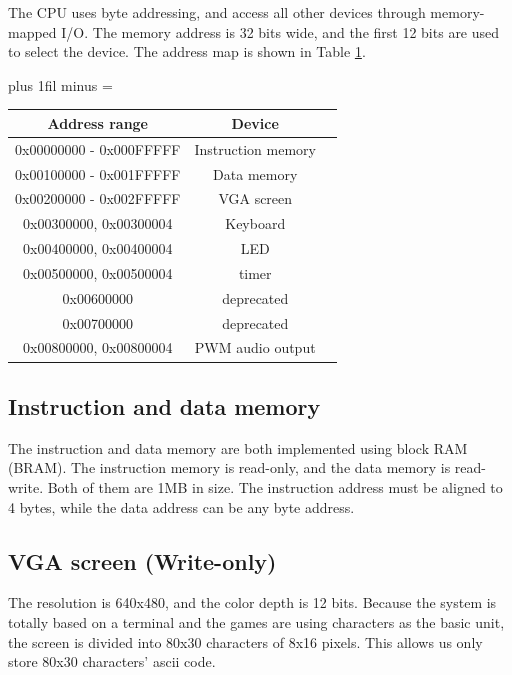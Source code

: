 \documentclass[
	a4paper, %
	11pt, %
]{CSUniSchoolLabReport}
\def\Scentering{\leftskip=0pt plus 1fil minus \Rmargin
                \rightskip=\leftskip}
\begin{document}
The CPU uses byte addressing, and access all other devices through memory-mapped I/O. The memory address is 32 bits wide, and the first 12 bits are used to select the device. The address map is shown in Table \ref{tab:address-map}.
\begin{table}[h]
    \Scentering
    \begin{tabular}{|c|c|c|}
        \hline
        Address range           & Device             \\
        \hline
        0x00000000 - 0x000FFFFF & Instruction memory \\
        \hline
        0x00100000 - 0x001FFFFF & Data memory        \\
        \hline
        0x00200000 - 0x002FFFFF & VGA screen         \\
        \hline
        0x00300000, 0x00300004  & Keyboard           \\
        \hline
        0x00400000, 0x00400004  & LED                \\
        \hline
        0x00500000, 0x00500004  & timer              \\
        \hline
        0x00600000              & deprecated         \\
        \hline
        0x00700000              & deprecated         \\
        \hline
        0x00800000, 0x00800004  & PWM audio output   \\
        \hline
    \end{tabular}
    \label{tab:address-map}
\end{table}

\subsection{Instruction and data memory}
The instruction and data memory are both implemented using block RAM (BRAM). The instruction memory is read-only, and the data memory is read-write. Both of them are 1MB in size. The instruction address must be aligned to 4 bytes, while the data address can be any byte address.
\subsection{VGA screen (Write-only)}
The resolution is 640x480, and the color depth is 12 bits. Because the system is totally based on a terminal and the games are using characters as the basic unit, the screen is divided into 80x30 characters of 8x16 pixels. This allows us only store 80x30 characters' ascii code.
\end{document}
